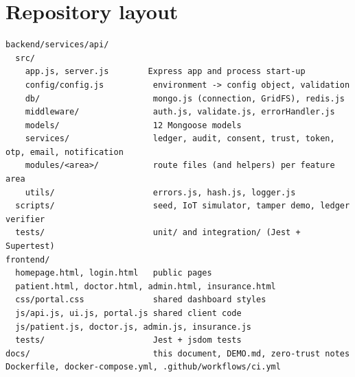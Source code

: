 \section{Repository layout}

\begin{lstlisting}[style=shell,caption={Repository layout}]
backend/services/api/
  src/
    app.js, server.js        Express app and process start-up
    config/config.js          environment -> config object, validation
    db/                       mongo.js (connection, GridFS), redis.js
    middleware/               auth.js, validate.js, errorHandler.js
    models/                   12 Mongoose models
    services/                 ledger, audit, consent, trust, token, otp, email, notification
    modules/<area>/           route files (and helpers) per feature area
    utils/                    errors.js, hash.js, logger.js
  scripts/                    seed, IoT simulator, tamper demo, ledger verifier
  tests/                      unit/ and integration/ (Jest + Supertest)
frontend/
  homepage.html, login.html   public pages
  patient.html, doctor.html, admin.html, insurance.html
  css/portal.css              shared dashboard styles
  js/api.js, ui.js, portal.js shared client code
  js/patient.js, doctor.js, admin.js, insurance.js
  tests/                      Jest + jsdom tests
docs/                         this document, DEMO.md, zero-trust notes
Dockerfile, docker-compose.yml, .github/workflows/ci.yml
\end{lstlisting}
